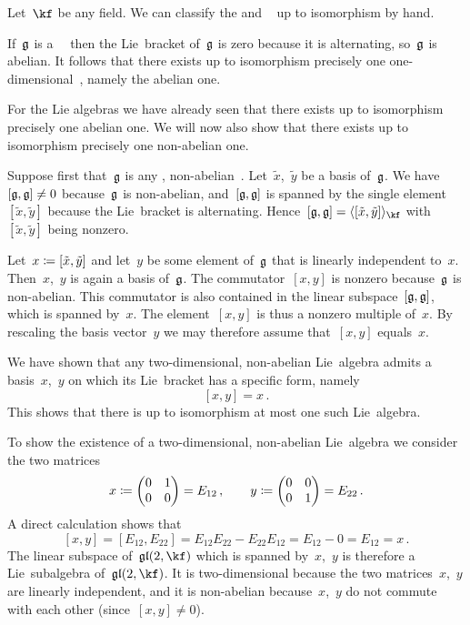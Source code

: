 \begin{example}
  Let~$\kf$ be any field.
  We can classify the {\onedimensional} and {\twodimensional}~\liealgebras{$\kf$} up to isomorphism by hand.
  
  If~$\mathfrak{g}$ is a~{\onedimensional}~\liealgebra{$\kf$} then the Lie~bracket of~$\mathfrak{g}$ is zero because it is alternating, so~$\mathfrak{g}$ is abelian.
  It follows that there exists up to isomorphism precisely one one-dimensional~\liealgebra{$\kf$}, namely the abelian one.
 
  For the {\twodimensional} Lie algebras we have already seen that there exists up to isomorphism precisely one abelian one.
  We will now also show that there exists up to isomorphism precisely one non-abelian one.
  
  Suppose first that~$\mathfrak{g}$ is any {\twodimensional}, non-abelian~\liealgebra{$\kf$}.
  Let~$\tilde{x}$,~$\tilde{y}$ be a basis of~$\mathfrak{g}$.
  We have~$[\mathfrak{g}, \mathfrak{g}] \neq 0$ because~$\mathfrak{g}$ is non-abelian, and~$[\mathfrak{g}, \mathfrak{g}]$ is spanned by the single element~$[\tilde{x}, \tilde{y}]$ because the Lie~bracket is alternating.
  Hence~$[\glie, \glie] = \gen{ [\tilde{x}, \tilde{y}] }_{\kf}$ with~$[\tilde{x}, \tilde{y}]$ being nonzero.

  Let~$x \coloneqq [\tilde{x},\tilde{y}]$ and let~$y$ be some element of~$\mathfrak{g}$ that is linearly independent to~$x$.
  Then~$x$,~$y$ is again a basis of~$\mathfrak{g}$.
  The commutator~$[x,y]$ is nonzero because~$\mathfrak{g}$ is non-abelian.
  This commutator is also contained in the linear subspace~$[\mathfrak{g}, \mathfrak{g}]$, which is spanned by~$x$.
  The element~$[x,y]$ is thus a nonzero multiple of~$x$.
  By rescaling the basis vector~$y$ we may therefore assume that~$[x,y]$ equals~$x$.

  We have shown that any two-dimensional, non-abelian Lie~algebra admits a basis~$x$,~$y$ on which its Lie~bracket has a specific form, namely
  \[
    [x,y] = x \,.
  \]
  This shows that there is up to isomorphism at most one such Lie~algebra.
 
  To show the existence of a two-dimensional, non-abelian Lie~algebra we consider the two matrices
  \[
    x
    \coloneqq
    \begin{pmatrix}
      0 & 1 \\
      0 & 0
    \end{pmatrix}
    =
    E_{12}  \,,
    \qquad
    y
    \coloneqq
    \begin{pmatrix}
      0 & 0 \\
      0 & 1
    \end{pmatrix}
    =
    E_{22}  \,.
  \]
  A direct calculation shows that
  \[
    [x,y]
    =
    [E_{12}, E_{22}]
    =
    E_{12} E_{22} - E_{22} E_{12}
    =
    E_{12} - 0
    =
    E_{12}
    =
    x \,.
  \]
  The linear subspace of~$\gllie(2, \kf)$ which is spanned by~$x$,~$y$ is therefore a Lie~subalgebra of~$\gllie(2, \kf)$.
  It is two-dimensional because the two matrices~$x$,~$y$ are linearly independent, and it is non-abelian because~$x$,~$y$ do not commute with each other (since~$[x,y] \neq 0$).


\end{example}

